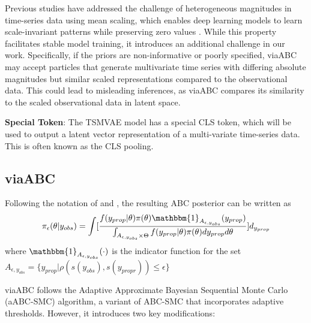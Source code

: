 \documentclass[12pt]{article} %
\begin{document}
Previous studies have addressed the challenge of heterogeneous magnitudes in time-series data using mean scaling, which enables deep learning models to learn scale-invariant patterns while preserving zero values \citep{ansari2024chronos}. While this property facilitates stable model training, it introduces an additional challenge in our work. Specifically, if the priors are non-informative or poorly specified, viaABC may accept particles that generate multivariate time series with differing absolute magnitudes but similar scaled representations compared to the observational data. This could lead to misleading inferences, as viaABC compares its similarity to the scaled observational data in latent space. 

\textbf{Special Token}: The TSMVAE model has a special CLS token, which will be used to output a latent vector representation of a multi-variate time-series data. This is often known as the CLS pooling. 



\subsection{viaABC}
Following the notation of \citep{marin2012approximate} and \citep{simola2021adaptive}, the resulting ABC posterior can be written as
$$
\pi_{\epsilon}(\theta | y_{obs}) = \int [\frac{f(y_{prop} | \theta)\pi(\theta)\mathbbm{1}_{A_{\epsilon, y_{obs}}}(y_{prop})}{\int_{A_{\epsilon, y_{obs}} \times \Theta } f(y_{prop} | \theta)\pi(\theta)dy_{prop}d\theta}]d_{y_{prop}}
$$
where $\mathbbm{1}_{A_{\epsilon, y_{obs}}}(\cdot)$ is the indicator function for the set $A_{\epsilon, y_{obs}} = \{y_{prop} | \rho (s(y_{obs}), s(y_{propr})) \leq \epsilon\}$

viaABC follows the Adaptive Approximate Bayesian Sequential Monte Carlo (aABC-SMC) algorithm, a variant of ABC-SMC that incorporates adaptive thresholds. However, it introduces two key modifications: 
\end{document}
